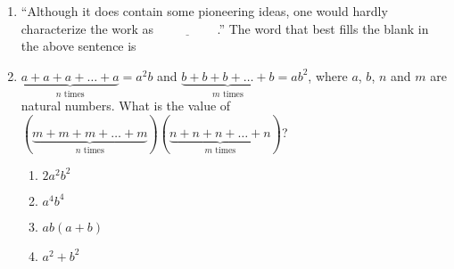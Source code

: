 \documentclass[journal]{IEEEtran}
\begin{document}
\begin{enumerate}
{      }
        \item {“Although it does contain some pioneering ideas, one would hardly characterize the work
        	as \( \underline{\hspace{2cm}} \).”
        	The word that best fills the blank in the above sentence is
        	\begin{enumerate}
        	\end{enumerate}
  		}
    
    \item {
    	\(\underbrace{a + a + a + \dots + a}_{n \text{ times}} = a^2 b\) and \(\underbrace{b + b + b + \dots + b}_{m \text{ times}} = a b^2\), where \(a\), \(b\), \(n\) and \(m\) are natural numbers. What is the value of \((\underbrace{m + m + m + \dots + m}_{n \text{ times}}) (\underbrace{n + n + n + \dots + n}_{m \text{ times}})\)?
    	\begin{multicols}{4}
	    	\begin{enumerate}
	    		\item \(2a^2b^2\)
	    		\item \(a^4b^4\) 
	    		\item\(ab(a+b)\) 
	    		\item \(a^2 + b^2\) 
	    	\end{enumerate}
    	\end{multicols}
    
}
\end{enumerate}
\end{document}
